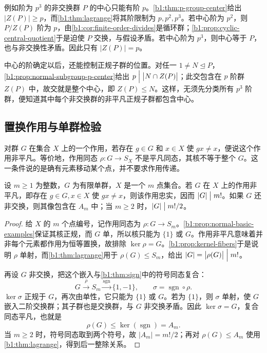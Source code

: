 \ProseParagraphBreak
例如阶为 \(p^3\) 的非交换群 \(P\) 的中心只能有阶 \(p\)。\cref{b1:thm:p-group-center}给出 \(\bigl|Z(P)\bigr|\geq p\)，而\cref{b1:thm:lagrange}将其阶限制为 \(p,p^2,p^3\)。若中心阶为 \(p^2\)，则 \(P/Z(P)\) 阶为 \(p\)，由\cref{b1:cor:finite-order-divides}是循环群；\cref{b1:prop:cyclic-central-quotient}于是迫使 \(P\) 交换，与假设矛盾。若中心阶为 \(p^3\)，则中心等于 \(P\)，也与非交换性矛盾。因此只有 \(\bigl|Z(P)\bigr|=p\)。

\ProseParagraphBreak
中心的阶确定以后，还能控制正规子群的位置。对任一 \(1\neq N\trianglelefteq P\)，\cref{b1:prop:normal-subgroup-p-center}给出 \(p\Bigm\vert\bigl|N\cap Z(P)\bigr|\)；此交包含在 \(p\) 阶群 \(Z(P)\) 中，故交就是整个中心，即 \(Z(P)\leq N\)。这样，无须先分类所有 \(p^3\) 阶群，便知道其中每个非交换群的非平凡正规子群都包含中心。

\subsection{置换作用与单群检验}
\label{b1:subsec:0504:02}

对群 \(G\) 在集合 \(X\) 上的一个作用，若存在 \(g\in G\) 和 \(x\in X\) 使 \(gx\ne x\)，便说这个作用非平凡。等价地，作用同态 \(\rho:G\rightarrow S_X\) 不是平凡同态，其核不等于整个 \(G\)。这一条件说的是确有元素移动某个点，并不要求作用传递。

\begin{proposition}[单群的置换表示限制]\label{b1:prop:simple-permutation-test}
	设 \(m\geq1\) 为整数，\(G\) 为有限单群，\(X\) 是一个 \(m\) 点集合。若 \(G\) 在 \(X\) 上的作用非平凡，即存在 \(g\in G,x\in X\) 使 \(gx\ne x\)，则该作用忠实，因而 \(|G|\bigm\vert m!\)。如果 \(G\) 还非交换，则其像包含在 \(A_m\) 中；当 \(m\geq2\) 时，\(|G|\bigm\vert m!/2\)。
\end{proposition}
\begin{proof}
	给 \(X\) 的 \(m\) 个点编号，记作用同态为 \(\rho:G\rightarrow S_m\)。\cref{b1:prop:normal-basic-examples}保证其核正规，而 \(G\) 单，所以核只能为 \(\{1\}\) 或 \(G\)。作用非平凡意味着并非每个元素都作用为恒等置换，故排除 \(\ker\rho=G\)。\cref{b1:prop:kernel-fibers}于是说明 \(\rho\) 单射，而\cref{b1:thm:lagrange}用于 \(\rho(G)\leq S_m\)，给出 \(|G|=\bigl|\rho(G)\bigr|\Bigm\vert m!\)。

	再设 \(G\) 非交换，把这个嵌入与\cref{b1:thm:sign}中的符号同态复合：
	\[
		G\xrightarrow{\rho}S_m \xrightarrow{\operatorname{sgn}}\{1,-1\}, \qquad \sigma=\operatorname{sgn}\circ\rho.
	\]
	\(\ker\sigma\) 正规于 \(G\)，再次由单性，它只能为 \(\{1\}\) 或 \(G\)。若为 \(\{1\}\)，则 \(\sigma\) 单射，使 \(G\) 嵌入二阶交换群；其子群也是交换群，与 \(G\) 非交换矛盾。因此 \(\ker\sigma=G\)，复合同态平凡，也就是
	\[
		\rho(G)\leq\ker(\operatorname{sgn})=A_m.
	\]
	当 \(m\geq2\) 时，符号同态取到两个符号，故 \(|A_m|=m!/2\)；再对 \(\rho(G)\leq A_m\) 使用\cref{b1:thm:lagrange}，得到后一整除关系。
\end{proof}

